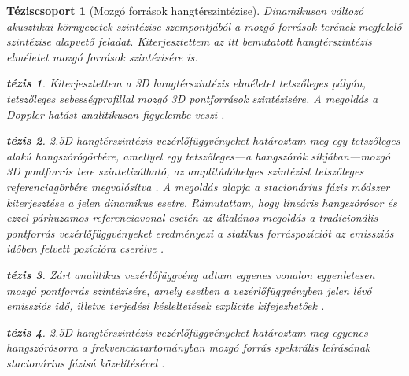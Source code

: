 \documentclass[10pt,twoside]{article}
\theoremstyle{thesisgroupstyle}
\newtheorem{thesisgroup}{Téziscsoport}
\theoremstyle{indented}
\newtheorem{thesis}{tézis}[thesisgroup]
\begin{document}
\begin{thesisgroup}[Mozgó források hangtérszintézise]
Dinamikusan változó akusztikai környezetek szintézise szempontjából a mozgó források terének megfelelő szintézise alapvető feladat.
Kiterjesztettem az itt bemutatott hangtérszintézis elméletet mozgó források szintézisére is.
\begin{thesis}
Kiterjesztettem a 3D hangtérszintézis elméletet tetszőleges pályán, tetszőleges sebességprofillal mozgó 3D pontforrások szintézisére.
A megoldás a Doppler-hatást analitikusan figyelembe veszi \cite{Firtha2015:daga, firtha2016wave_booklet, doi:10.1121/1.4996126_booklet}.\end{thesis}
\begin{thesis}
2.5D hangtérszintézis vezérlőfüggvényeket határoztam meg egy tetszőleges alakú hangszórógörbére, amellyel egy tetszőleges---a hangszórók síkjában---mozgó 3D pontforrás tere szintetizálható, az amplitúdóhelyes szintézist tetszőleges referenciagörbére megvalósítva \cite{doi:10.1121/1.4996126_booklet}.
A megoldás alapja a stacionárius fázis módszer kiterjesztése a jelen dinamikus esetre.
Rámutattam, hogy lineáris hangszórósor és ezzel párhuzamos referenciavonal esetén az általános megoldás a tradicionális pontforrás vezérlőfüggvényeket eredményezi a statikus forráspozíciót az emissziós időben felvett pozícióra cserélve \cite{doi:10.1121/1.4996126_booklet}.
\end{thesis}
\begin{thesis}
Zárt analitikus vezérlőfüggvény adtam egyenes vonalon egyenletesen mozgó pontforrás szintézisére, amely esetben a vezérlőfüggvényben jelen lévő emissziós idő, illetve terjedési késleltetések explicite kifejezhetőek \cite{firtha2016wave_booklet}.
\end{thesis}
\begin{thesis}
2.5D hangtérszintézis vezérlőfüggvényeket határoztam meg egyenes hangszórósorra a frekvenciatartományban mozgó forrás spektrális leírásának stacionárius fázisú közelítésével \cite{firtha2015sound_booklet}.
\end{thesis}
\end{thesisgroup}
\end{document}
